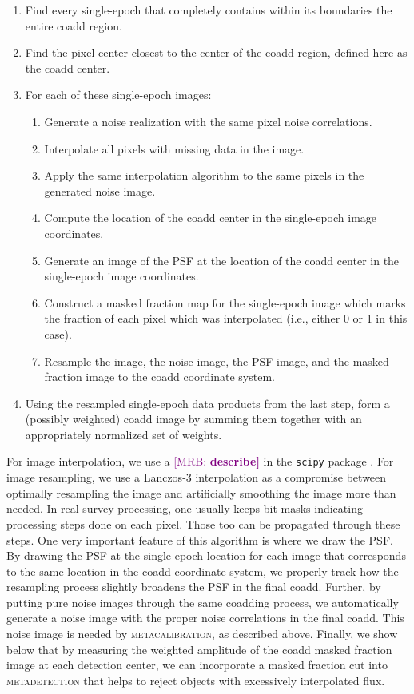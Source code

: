 \documentclass[twocolappendix, appendixfloats, numberedappendix, twocolumn, apj]{openjournal}
\newcommand{\mrb}[1]{\textcolor{purple}{[MRB: \bf #1]}\xspace}
\newcommand{\mdet}{\textsc{metadetection}\xspace}
\newcommand{\mcal}{\textsc{metacalibration}\xspace}
\begin{document}
\begin{enumerate}
\item Find every single-epoch that completely contains within its boundaries the entire coadd region.
\item Find the pixel center closest to the center of the coadd region, defined here as the coadd center.
\item For each of these single-epoch images:
\begin{enumerate}
  \item Generate a noise realization with the same pixel noise correlations.
  \item Interpolate all pixels with missing data in the image.
  \item Apply the same interpolation algorithm to the same pixels in the generated noise image.
  \item Compute the location of the coadd center in the single-epoch image coordinates.
  \item Generate an image of the PSF at the location of the coadd center in the single-epoch image coordinates.
  \item Construct a masked fraction map for the single-epoch image which marks the fraction of each pixel
  which was interpolated (i.e., either 0 or 1 in this case).
  \item Resample the image, the noise image, the PSF image, and the masked fraction image to the coadd coordinate system.
\end{enumerate}
\item Using the resampled single-epoch data products from the last step, form a (possibly weighted) coadd image
by summing them together with an appropriately normalized set of weights.
\end{enumerate}
For image interpolation, we use a \mrb{describe} in the \texttt{scipy} package \citep{scipy}. For image resampling,
we use a Lanczos-3 interpolation as a compromise between optimally resampling the image and artificially
smoothing the image more than needed. In real survey processing, one usually keeps bit masks indicating
processing steps done on each pixel. Those too can be propagated through these steps. One very important
feature of this algorithm is where we draw the PSF. By drawing the PSF at the single-epoch location for each
image that corresponds to the same location in the coadd coordinate system, we properly track how the resampling
process slightly broadens the PSF in the final coadd. Further, by putting pure noise images through the same
coadding process, we automatically generate a noise image with the proper noise correlations in the final coadd.
This noise image is needed by \mcal, as described above. Finally, we show below that by measuring the weighted
amplitude of the coadd masked fraction image at each detection center, we can incorporate a masked fraction cut
into \mdet that helps to reject objects with excessively interpolated flux.
\end{document}
